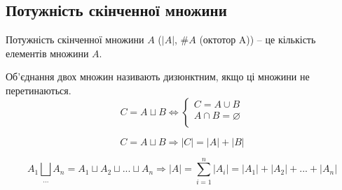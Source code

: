 \subsection{Потужність скінченної множини}

\begin{definition}
    Потужність скінченної множини $A$ ($|A|$, $\#A$ (октотор A)) -- це кількість елементів множини $A$.
\end{definition}

\begin{definition}
    Об'єднання двох множин називають дизюнктним, якщо ці множини не перетинаються.
    \begin{equation*}
        C = A \sqcup B \Leftrightarrow \left\{ \begin{array}{l}
            C = A \cup B  \\
            A \cap B = \varnothing  \\
        \end{array} \right.
    \end{equation*}
\end{definition}

\begin{theorem}
    $$C = A \sqcup B \Rightarrow |C| = |A| + |B|$$
\end{theorem}

\begin{corollary}
    $$A_1 \bigsqcup\limits_{...} A_n = A_1 \sqcup A_2 \sqcup ... \sqcup A_n 
    \Rightarrow |A| = \sum\limits_{i=1}^{n} |A_i| = |A_1| + |A_2| + ... + |A_n|$$
\end{corollary}

